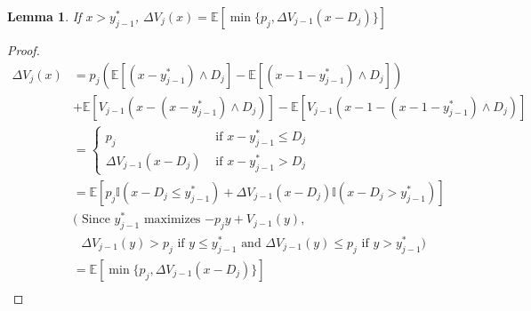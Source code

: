 \documentclass[11pt,a4paper]{article}
\newtheorem{lemma}{Lemma}
\begin{document}
\begin{lemma}
    If $x> y^*_{j-1}$, $\Delta V_j(x)=\mathbb{E}[\min\{p_j,\Delta V_{j-1}(x-D_j)\}]$
\end{lemma}
\begin{proof}
\quad\\
\begin{equation}
    \begin{aligned}
        \Delta V_j(x)&=p_j(\mathbb{E}[(x-y_{j-1}^*)\wedge D_j]-\mathbb{E}[(x-1-y_{j-1}^*)\wedge D_j])\\&+\mathbb{E}[V_{j-1}(x-(x-y_{j-1}^*)\wedge D_j)]-\mathbb{E}[V_{j-1}(x-1-(x-1-y_{j-1}^*)\wedge D_j)]\\
        &=\left\{\begin{matrix}
        p_j    &\text{ if }x-y^*_{j-1}\leq D_j\\
        \Delta V_{j-1}(x-D_j)    &\text{ if }x-y^*_{j-1}> D_j
        \end{matrix}\right.\\
        &=\mathbb{E}[p_j \mathbb{I}(x-D_j\leq y_{j-1}^*)+\Delta V_{j-1}(x-D_j)\mathbb{I}(x-D_j> y_{j-1}^*)]\\
        &(\text{ Since $y_{j-1}^*$ maximizes $-p_j y+V_{j-1}(y)$,}\\&\text{ $\Delta V_{j-1}(y)> p_j$ if $y\leq y_{j-1}^*$ and $\Delta V_{j-1}(y)\leq p_j$ if $y> y_{j-1}^*$})\\
        &=\mathbb{E}[\min\{p_j,\Delta V_{j-1}(x-D_j)\}]\\
    \end{aligned}
    \nonumber
\end{equation}
\end{proof}
\end{document}
